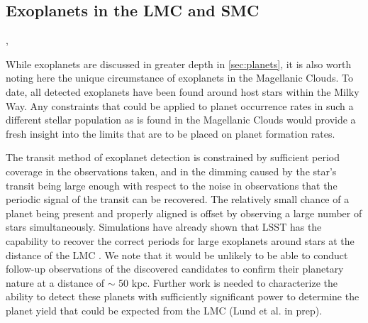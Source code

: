 %
%

\subsection{Exoplanets in the LMC and SMC}
\def\secname{\chpname:MC_exoplanets}\label{sec:\secname}

,


While exoplanets are discussed in greater depth in \autoref{sec:planets}, it is
also worth noting here the unique circumstance of exoplanets in the
Magellanic Clouds. To date, all detected exoplanets have been found around
host stars within the Milky Way. Any constraints that could be applied to
planet occurrence rates in such a different stellar population as is found
in the Magellanic Clouds would provide a fresh insight into the limits
that are to be placed on planet formation rates.

The transit method of exoplanet detection is constrained by sufficient
period coverage in the observations taken, and in the dimming caused by
the star's transit being large enough with respect to the noise in
observations that the periodic signal of the transit can be recovered.
The relatively small chance of a planet being present and properly
aligned is offset by observing a large number of stars simultaneously.
Simulations have already shown that LSST has the capability to recover
the correct periods for large exoplanets around stars at the distance of
the LMC \citet{2015AJ....149...16L}.  We note that it would be unlikely
to be able to conduct follow-up observations of the discovered
candidates to confirm their planetary nature at a distance of $\sim$
50 kpc.  Further work is needed to characterize the ability to detect
these planets with sufficiently significant power to determine the
planet yield that could be expected from the LMC (Lund et al. in prep).


